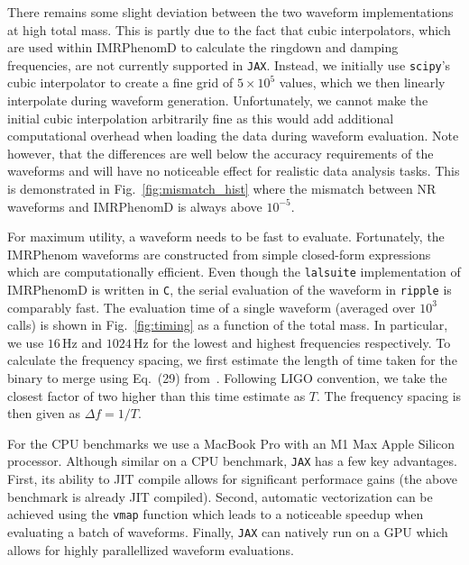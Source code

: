 \documentclass[twocolumn]{aastex631}
\newcommand{\jax}{\texttt{JAX}\xspace}
\newcommand{\ripple}{\texttt{ripple}\xspace}
\newcommand{\lalsuite}{\texttt{lalsuite}\xspace}
\begin{document}
There remains some slight deviation between the two waveform implementations at high total mass. 
This is partly due to the fact that cubic interpolators, which are used within IMRPhenomD to calculate the ringdown and damping frequencies, are not currently supported in \jax. 
Instead, we initially use \texttt{scipy}'s cubic interpolator to create a fine grid of $5\times10^5$ values, which we then linearly interpolate during waveform generation.
Unfortunately, we cannot make the initial cubic interpolation arbitrarily fine as this would add additional computational overhead when loading the data during waveform evaluation.
Note however, that the differences are well below the accuracy requirements of the waveforms and will have no noticeable effect for realistic data analysis tasks.
This is demonstrated in Fig.~\ref{fig:mismatch_hist} where the mismatch between NR waveforms and IMRPhenomD is always above $10^{-5}$.

For maximum utility, a waveform needs to be fast to evaluate.
Fortunately, the IMRPhenom waveforms are constructed from simple closed-form expressions which are computationally efficient.
Even though the \lalsuite implementation of IMRPhenomD is written in \texttt{C}, the serial evaluation of the waveform in \ripple is comparably fast. 
The evaluation time of a single waveform (averaged over $10^3$ calls) is shown in Fig.~\ref{fig:timing} as a function of the total mass. 
In particular, we use $16\,\mathrm{Hz}$ and $1024\,\mathrm{Hz}$ for the lowest and highest frequencies respectively.
To calculate the frequency spacing, we first estimate the length of time taken for the binary to merge using Eq.~(29) from~\cite{Yu:2023lml}. 
Following LIGO convention, we take the closest factor of two higher than this time estimate as $T$. 
The frequency spacing is then given as $\Delta f = 1/T$.

For the CPU benchmarks we use a MacBook Pro with an M1 Max Apple Silicon processor. 
Although similar on a CPU benchmark, \jax has a few key advantages. 
First, its ability to JIT compile allows for significant performace gains (the above benchmark is already JIT compiled).
Second, automatic vectorization can be achieved using the \texttt{vmap} function which leads to a noticeable speedup when evaluating a batch of waveforms.
Finally, \jax can natively run on a GPU which allows for highly parallellized waveform evaluations.
\end{document}
